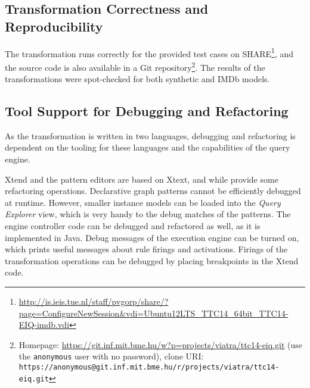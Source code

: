 \subsection{Transformation Correctness and Reproducibility}

The transformation runs correctly for the provided test cases on SHARE\footnote{\url{http://is.ieis.tue.nl/staff/pvgorp/share/?page=ConfigureNewSession&vdi=Ubuntu12LTS_TTC14_64bit_TTC14-EIQ-imdb.vdi}}, and the source code is also available in a Git repository\footnote{Homepage: \url{https://git.inf.mit.bme.hu/w?p=projects/viatra/ttc14-eiq.git} (use the \texttt{anonymous} user with no password), clone URI: \texttt{https://anonymous@git.inf.mit.bme.hu/r/projects/viatra/ttc14-eiq.git}}. The results of the transformations were spot-checked for both synthetic and IMDb models.  

\subsection{Tool Support for Debugging and Refactoring}

As the transformation is written in two languages, debugging and refactoring is dependent on the tooling for these languages and the capabilities of the query engine. 

Xtend and the \incquery{} pattern editors are based on Xtext, and while provide some refactoring operations. Declarative \incquery{} graph patterns cannot be efficiently debugged at runtime. However, smaller instance models can be loaded into the \emph{Query Explorer} view, which is very handy to the debug matches of the patterns. The engine controller code can be debugged and refactored as well, as it is implemented in Java. Debug messages of the execution engine can be turned on, which prints useful messages about rule firings and activations. Firings of the transformation operations can be debugged by placing breakpoints in the Xtend code.

